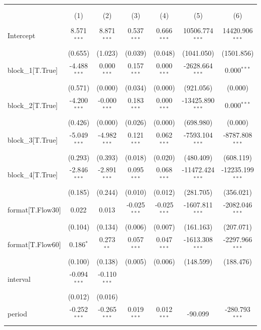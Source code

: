 \begin{table}[!htbp] \centering
\begin{tabular}{@{\extracolsep{5pt}}lcccccc}
\\[-1.8ex]\hline
\hline \\[-1.8ex]
\\[-1.8ex] & (1) & (2) & (3) & (4) & (5) & (6) \\
\hline \\[-1.8ex]
 Intercept & 8.571$^{***}$ & 8.871$^{***}$ & 0.537$^{***}$ & 0.666$^{***}$ & 10506.774$^{***}$ & 14420.906$^{***}$ \\
& (0.655) & (1.023) & (0.039) & (0.048) & (1041.050) & (1501.856) \\
 block_1[T.True] & -4.488$^{***}$ & 0.000$^{***}$ & 0.157$^{***}$ & 0.000$^{***}$ & -2628.664$^{***}$ & 0.000$^{***}$ \\
& (0.571) & (0.000) & (0.034) & (0.000) & (921.056) & (0.000) \\
 block_2[T.True] & -4.200$^{***}$ & -0.000$^{***}$ & 0.183$^{***}$ & 0.000$^{***}$ & -13425.890$^{***}$ & 0.000$^{***}$ \\
& (0.426) & (0.000) & (0.026) & (0.000) & (698.980) & (0.000) \\
 block_3[T.True] & -5.049$^{***}$ & -4.982$^{***}$ & 0.121$^{***}$ & 0.062$^{***}$ & -7593.104$^{***}$ & -8787.808$^{***}$ \\
& (0.293) & (0.393) & (0.018) & (0.020) & (480.409) & (608.119) \\
 block_4[T.True] & -2.846$^{***}$ & -2.891$^{***}$ & 0.095$^{***}$ & 0.068$^{***}$ & -11472.424$^{***}$ & -12235.199$^{***}$ \\
& (0.185) & (0.244) & (0.010) & (0.012) & (281.705) & (356.021) \\
 format[T.Flow30] & 0.022$^{}$ & 0.013$^{}$ & -0.025$^{***}$ & -0.025$^{***}$ & -1607.811$^{***}$ & -2082.046$^{***}$ \\
& (0.104) & (0.134) & (0.006) & (0.007) & (161.163) & (207.071) \\
 format[T.Flow60] & 0.186$^{*}$ & 0.273$^{**}$ & 0.057$^{***}$ & 0.047$^{***}$ & -1613.308$^{***}$ & -2297.966$^{***}$ \\
& (0.100) & (0.138) & (0.005) & (0.006) & (148.599) & (188.476) \\
 interval & -0.094$^{***}$ & -0.110$^{***}$ & & & & \\
& (0.012) & (0.016) & & & & \\
 period & -0.252$^{***}$ & -0.265$^{***}$ & 0.019$^{***}$ & 0.012$^{***}$ & -90.099$^{}$ & -280.793$^{***}$ \\

\end{tabular}
\end{table}
